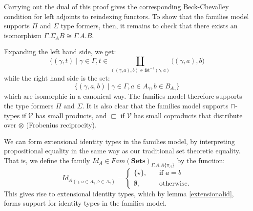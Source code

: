 \documentclass[a4paper,english]{lipics-v2018}
\begin{document}
Carrying out the dual of this proof gives the corresponding Beck-Chevalley condition for left adjoints to reindexing functors.
To show that the families model supports $\Pi$ and $\Sigma$ type formers, then, it remains to check that there exists an isomorphism $\Gamma.\Sigma_AB \cong \Gamma.A.B$.


Expanding the left hand side, we get:
\[
  \{(\gamma, t) \; | \; \gamma \in \Gamma, t \in \coprod_{((\gamma, a), b) \in \text{fst}^{-1}(\gamma, a)}\Big ((\gamma, a), b\Big)
\]
while the right hand side is the set:
\[
  \{(\gamma, a, b) \; | \; \gamma \in \Gamma, a \in A_\gamma, b \in B_{A_\gamma}\}
\]
which are isomorphic in a canonical way. The families model therefore supports the type formers $\Pi$ and $\Sigma$. It is also clear that the families model supports $\sqcap$-types if $\mathcal{V}$ has small products, and $\sqsubset$ if $\mathcal{V}$ has small coproducts that distribute over $\otimes$ (Frobenius reciprocity).

We can form extensional identity types in the families model, by interpreting propositional equality in the same way as our traditional set theoretic equality. That is, we define the family $Id_A \in Fam(\mathbf{Sets})_{\Gamma.A.A\{\pi_A\}}$ by the function:
\[
  {Id_A}_{(\gamma, a \in A_\gamma, b \in A_\gamma)} = \begin{cases} \{ \star \}, &\quad \text{if } a = b\\
  \emptyset, &\quad \text{otherwise.}
    \end{cases}
\]
This gives rise to extensional identity types, which by lemma \ref{extensionalid}, forms support for identity types in the families model.
\end{document}
